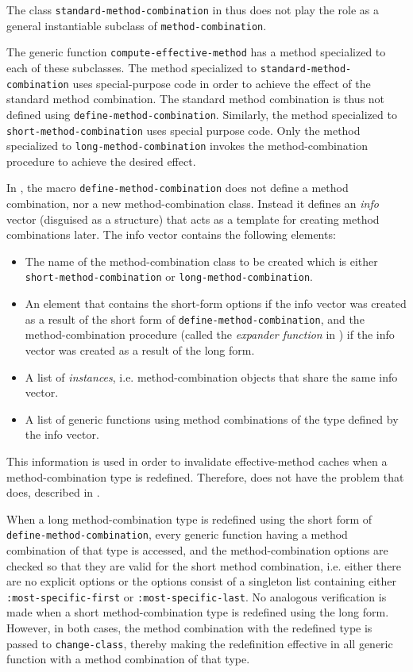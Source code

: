 The class \texttt{standard-method-combination} in \ccl{} thus does not
play the role as a general instantiable subclass of
\texttt{method-combination}.

The generic function \texttt{compute-effective-method} has a method
specialized to each of these subclasses.  The method specialized to
\texttt{standard-method-combination} uses special-purpose code in
order to achieve the effect of the standard method combination.  The
standard method combination is thus not defined using
\texttt{define-method-combination}.  Similarly, the method specialized
to \texttt{short-method-combination} uses special purpose code.  Only
the method specialized to \texttt{long-method-combination} invokes the
method-combination procedure to achieve the desired effect.

In \ccl{}, the macro \texttt{define-method-combination} does not
define a method combination, nor a new method-combination class.
Instead it defines an \emph{info} vector (disguised as a structure)
that acts as a template for creating method combinations later.  The
info vector contains the following elements:

\begin{itemize}
\item The name of the method-combination class to be created which is
  either \texttt{short-method-combination} or
  \texttt{long-method-combination}.
\item An element that contains the short-form options if the info
  vector was created as a result of the short form of
  \texttt{define-method-combination}, and the method-combination
  procedure (called the \emph{expander function} in \ccl{}) if the
  info vector was created as a result of the long form.
\item A list of \emph{instances}, i.e. method-combination objects that
  share the same info vector.
\item A list of generic functions using method combinations of the
  type defined by the info vector.
\end{itemize}

This information is used in order to invalidate effective-method
caches when a method-combination type is redefined.  Therefore, \ccl{}
does not have the problem that \pcl{} does, described in
.

When a long method-combination type is redefined using the short form
of \texttt{define-method-combination}, every generic function having
a method combination of that type is accessed, and the
method-combination options are checked so that they are valid for the
short method combination, i.e. either there are no explicit options or
the options consist of a singleton list containing either
\texttt{:most-specific-first} or \texttt{:most-specific-last}.  No
analogous verification is made when a short method-combination type is
redefined using the long form.  However, in both cases, the method
combination with the redefined type is passed to
\texttt{change-class}, thereby making the redefinition effective in
all generic function with a method combination of that type.

